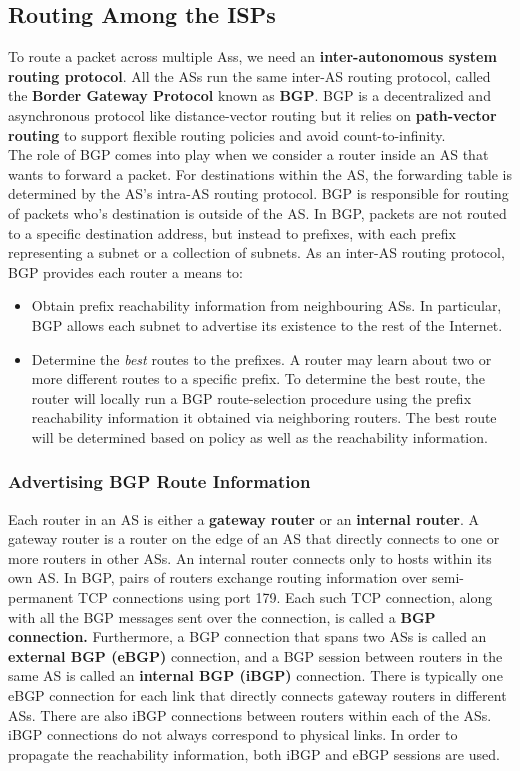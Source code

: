 \subsection{Routing Among the ISPs}
To route a packet across multiple Ass, we need an \textbf{inter-autonomous system routing protocol}. All the ASs run the same inter-AS routing protocol, called the \textbf{Border Gateway Protocol} known as \textbf{BGP}. BGP is a decentralized and asynchronous protocol like distance-vector routing but it relies on \textbf{path-vector routing} to support flexible routing policies and avoid count-to-infinity.\vspace{.3cm}\\
The role of BGP comes into play when we consider a router inside an AS that wants to forward a packet. For destinations within the AS, the forwarding table is determined by the AS's intra-AS routing protocol. BGP is responsible for routing of packets who's destination is outside of the AS. In BGP, packets are not routed to a specific destination address, but instead to prefixes, with each prefix representing a subnet or a collection of subnets. As an inter-AS routing protocol, BGP provides each router a means to:
\begin{itemize}
\item Obtain prefix reachability information from neighbouring ASs. In particular, BGP allows each subnet to advertise its existence to the rest of the Internet. 
\item Determine the \textit{best} routes to the prefixes. A router may learn about two or more different routes to a specific prefix. To determine the best route, the router will locally run a BGP route-selection procedure using the prefix reachability information it obtained via neighboring routers. The best route will be determined based on policy as well as the reachability information.
\end{itemize}

\subsubsection{Advertising BGP Route Information}
Each router in an AS is either a \textbf{gateway router} or an \textbf{internal router}. A gateway router is a router on the edge of an AS that directly connects to one or more routers in other ASs. An internal router connects only to hosts within its own AS. In BGP, pairs of routers exchange routing information over semi-permanent TCP connections using port 179. Each such TCP connection, along with all the BGP messages sent over the connection, is called a \textbf{BGP connection.} Furthermore, a BGP connection that spans two ASs is called an \textbf{external BGP (eBGP)} connection, and a BGP session between routers in the same AS is called an \textbf{internal BGP (iBGP)} connection.  There is typically one eBGP connection for each link that directly connects gateway routers in different ASs. There are also iBGP connections between routers within each of the ASs. iBGP connections do not always correspond to physical links. In order to propagate the reachability information, both iBGP and eBGP sessions are used.

